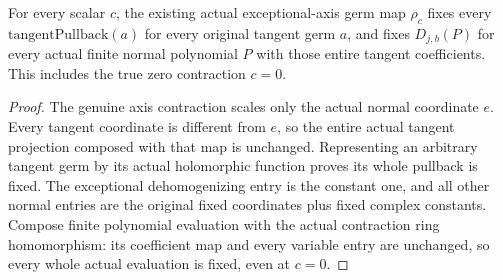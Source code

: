 \begin{theorem}
\label{hir:actual-normal-axis-fixed-analytic-dehomogenization}
For every scalar $c$, the existing actual exceptional-axis germ map
$\rho_c$ fixes every $\mathrm{tangentPullback}(a)$ for every original
tangent germ $a$, and fixes $D_{j,b}(P)$ for every actual finite
normal polynomial $P$ with those entire tangent coefficients.
This includes the true zero contraction $c=0$.
\leanok
\end{theorem}
\begin{proof}
The genuine axis contraction scales only the actual normal coordinate
$e$. Every tangent coordinate is different from $e$, so the entire
actual tangent projection composed with that map is unchanged.
Representing an arbitrary tangent germ by its actual holomorphic
function proves its whole pullback is fixed. The exceptional
dehomogenizing entry is the constant one, and all other normal entries
are the original fixed coordinates plus fixed complex constants.
Compose finite polynomial evaluation with the actual contraction
ring homomorphism: its coefficient map and every variable entry are
unchanged, so every whole actual evaluation is fixed, even at $c=0$.
\end{proof}

